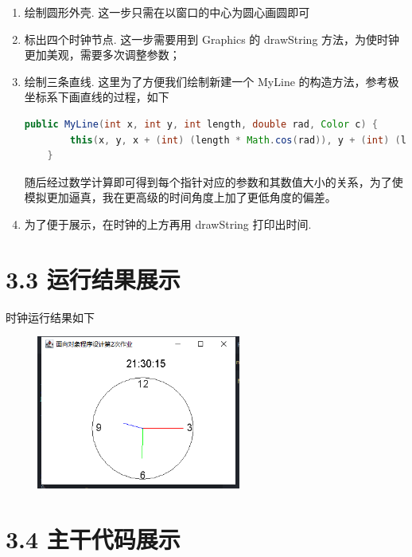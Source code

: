 \begin{enumerate}
    \item 绘制圆形外壳. 这一步只需在以窗口的中心为圆心画圆即可
    \item 标出四个时钟节点. 这一步需要用到 Graphics 的 drawString 方法，为使时钟更加美观，需要多次调整参数；
    \item 绘制三条直线. 这里为了方便我们绘制新建一个 MyLine 的构造方法，参考极坐标系下画直线的过程，如下
    \begin{lstlisting}[language = Java]
    public MyLine(int x, int y, int length, double rad, Color c) {
        this(x, y, x + (int) (length * Math.cos(rad)), y + (int) (length * Math.sin(rad)),c);
    }
    \end{lstlisting}
    随后经过数学计算即可得到每个指针对应的参数和其数值大小的关系，为了使模拟更加逼真，我在更高级的时间角度上加了更低角度的偏差。
    \item 为了便于展示，在时钟的上方再用 drawString 打印出时间.
\end{enumerate}

\section{3.3 运行结果展示}

时钟运行结果如下
\begin{figure}[H]
    \centering
    \includegraphics[width = 0.6\textwidth]{../pic/3/3.3.png}
\end{figure}

\section{3.4 主干代码展示}


